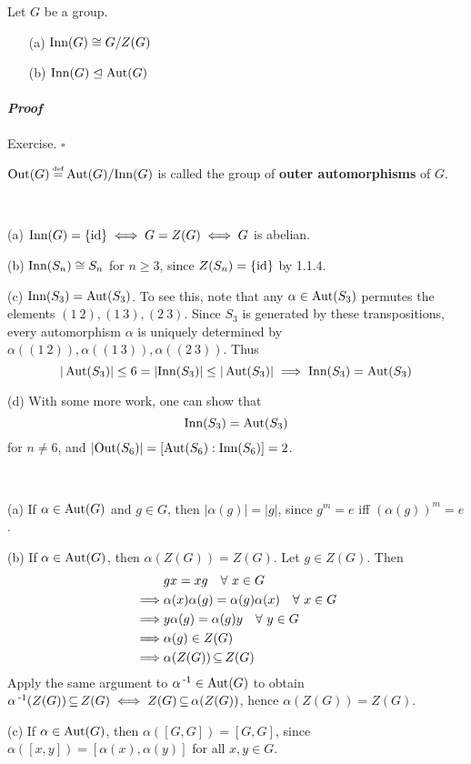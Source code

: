 \documentclass[11pt]{book}
\theoremstyle{definition}   \newtheorem{defn}[counter]{Definition} %
\newcommand{\nsg}{\mathrel{\unlhd}}   \newcommand{\ind}{\parindent24pt}   \newcommand{\vn}{\varnothing}
\newcommand\myeq{\mathrel{\overset{\makebox[0pt]{\mbox{\normalfont\tiny\sffamily \textrm{def}}}}{=}}}
\newcommand{\inn}{\textnormal{Inn}}   \newcommand{\out}{\textnormal{Out}}   \newcommand{\car}{\textnormal{ char }}   \newcommand{\id}{\textnormal{id}}   \newcommand{\triv}{\{e\}}
\newenvironment{prf}{\paragraph{\textit{Proof}}}{\hfill$\square$}
\newcommand{\vs}{\vspace{8pt}}
\numberwithin{counter}{chapter}
\begin{document}
\vs

\begin{lemma}Let $G$ be a group.
\begin{enumerate}
\item[(a)] $\inn(G) \cong G/Z(G)$
\item[(b)] $\inn(G) \nsg \aut(G)$
\end{enumerate}
\end{lemma}

\begin{prf}
Exercise.
\end{prf}

\vs

\begin{remark*}
$\out(G) \myeq \aut(G) / \inn(G)$ is called the group of \textbf{outer automorphisms} of $G$.
\end{remark*}

\vs

\begin{example}\
\item[(a)] $\inn(G) = \{\id\} \iff G = Z(G) \iff G$ is abelian.
\item[(b)] $\inn(S_n) \cong S_n$ for $n \geq 3$, since $Z(S_n) = \{\id\}$ by 1.1.4.
\item[(c)] $\inn(S_3) = \aut(S_3)$. To see this, note that any $\alpha \in \operatorname{\textnormal{Aut}}(S_3)$ permutes the elements $(1\ 2),(1\ 3),(2\ 3)$. Since $S_3$ is generated by these transpositions, every automorphism $\alpha $ is uniquely determined by $\alpha((1\ 2)),\alpha((1\ 3)),\alpha((2\ 3))$. Thus
	\[|\aut(S_3)| \leq 6 = |\inn(S_3)| \leq |\aut(S_3)| \implies \inn(S_3) = \aut(S_3) \]
\item[(d)] With some more work, one can show that
	\[\inn(S_3) = \aut(S_3) \]
for $n \ne 6$, and $|\out(S_6)| = [\aut(S_6) : \inn(S_6)] = 2$.
\end{example}

\vs

\begin{remark}\
\item[(a)] If $\alpha \in \operatorname{\textnormal{Aut}}(G)$ and $g \in G$, then $|\alpha(g)| = |g|$, since $g^m = e$ iff $(\alpha(g))^m = e$.
\item[(b)] If $\alpha \in \operatorname{\textnormal{Aut}}(G)$, then $\alpha(Z(G)) = Z(G)$. Let $g \in Z(G)$. Then
	\begin{align*}
	& gx = xg \quad \forall\ x \in G \\
	\implies & \alpha(x)\alpha(g) = \alpha(g)\alpha(x) \quad \forall\ x \in G \\
	\implies & y\alpha(g) = \alpha(g)y \quad \forall\ y \in G \\
	\implies & \alpha(g) \in Z(G) \\
	\implies & \alpha(Z(G)) \operatorname{\subseteq} Z(G)
	\end{align*}
Apply the same argument to $\alpha\operatorname{^{-1}} \in \operatorname{\textnormal{Aut}}(G)$ to obtain $\alpha\operatorname{^{-1}}(Z(G)) \operatorname{\subseteq} Z(G) \iff Z(G) \operatorname{\subseteq} \alpha(Z(G))$, hence $\alpha(Z(G)) = Z(G)$.

\item[(c)] If $\alpha \in \operatorname{\textnormal{Aut}}(G)$, then $\alpha([G,G]) = [G,G]$, since $\alpha([x,y]) = [\alpha(x),\alpha(y)]$ for all $x,y \in G$.
\end{remark}
\end{document}
